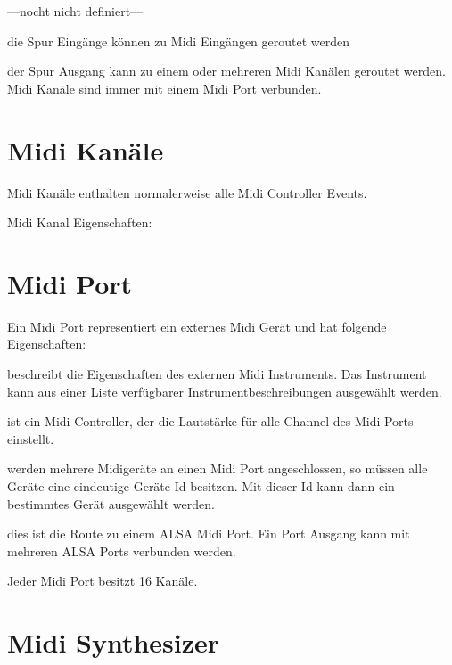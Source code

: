        ---nocht nicht definiert---

       die Spur Eingänge können zu Midi Eingängen
            geroutet werden

       der Spur Ausgang kann zu einem oder mehreren
            Midi Kanälen geroutet werden. Midi Kanäle sind immer mit
            einem Midi Port verbunden.

      \blank[big]

  \section{Midi Kanäle}
      Midi Kanäle enthalten normalerweise alle Midi Controller Events.

      Midi Kanal Eigenschaften:

      \blank[big]

      \blank[big]

  \section{Midi Port}

       Ein Midi Port representiert ein externes Midi 
      Gerät und hat folgende Eigenschaften:

      \blank[big]
        beschreibt die 
        Eigenschaften des externen
        Midi Instruments. Das Instrument kann aus einer Liste verfügbarer
        Instrumentbeschreibungen ausgewählt werden.

        ist ein Midi 
      Controller, der die Lautstärke für alle Channel des Midi Ports 
      einstellt.

        werden mehrere Midigeräte 
      an einen Midi Port
      angeschlossen, so müssen alle Geräte eine eindeutige Geräte Id
      besitzen. Mit dieser Id kann dann ein bestimmtes Gerät
      ausgewählt werden.

       dies ist die Route zu einem ALSA Midi Port.
      Ein Port Ausgang kann mit mehreren ALSA Ports verbunden werden.

      \blank[big]

      Jeder Midi Port besitzt 16 Kanäle.

  \section{Midi Synthesizer}

